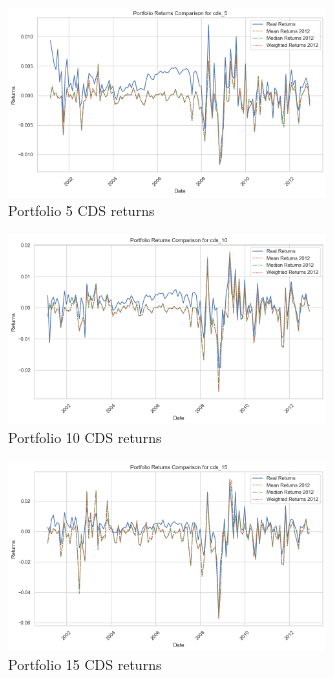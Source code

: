 \documentclass{article}
\begin{document}
\begin{figure}[H]
    \centering
    \includegraphics[width=0.75\textwidth]{../assets/returns_cds5_insample.png}
    \caption{\label{fig:cds_rets_p5}Portfolio 5 CDS returns}
    \end{figure}    

\begin{figure}[H]
    \centering
    \includegraphics[width=0.75\textwidth]{../assets/returns_cds10_insample.png}
    \caption{\label{fig:cds_rets_p10}Portfolio 10 CDS returns}
    \end{figure}

\begin{figure}[H]
    \centering
    \includegraphics[width=0.75\textwidth]{../assets/returns_cds15_insample.png}
    \caption{\label{fig:cds_rets_p15}Portfolio 15 CDS returns}
    \end{figure}          
\end{document}
